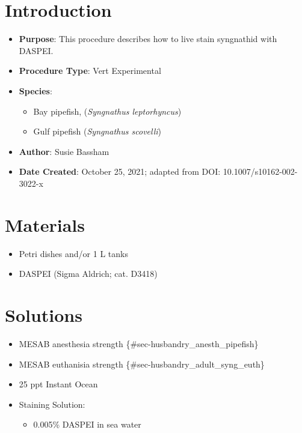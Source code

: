 \documentclass[
  letterpaper,
  DIV=11,
  numbers=noendperiod]{scrreprt}
\providecommand{\tightlist}{%
  \setlength{\itemsep}{0pt}\setlength{\parskip}{0pt}}\usepackage{longtable,booktabs,array}
\begin{document}
\hypertarget{introduction-64}{%
\section{Introduction}\label{introduction-64}}

\begin{itemize}
\tightlist
\item
  \textbf{Purpose}: This procedure describes how to live stain
  syngnathid with DASPEI.
\item
  \textbf{Procedure Type}: Vert Experimental
\item
  \textbf{Species}:

  \begin{itemize}
  \tightlist
  \item
    Bay pipefish, (\emph{Syngnathus leptorhyncus})
  \item
    Gulf pipefish (\emph{Syngnathus scovelli})
  \end{itemize}
\item
  \textbf{Author}: Susie Bassham
\item
  \textbf{Date Created}: October 25, 2021; adapted from DOI:
  10.1007/s10162-002-3022-x
\end{itemize}

\hypertarget{materials-59}{%
\section{Materials}\label{materials-59}}

\begin{itemize}
\tightlist
\item
  Petri dishes and/or 1 L tanks
\item
  DASPEI (Sigma Aldrich; cat. D3418)
\end{itemize}

\hypertarget{solutions-56}{%
\section{Solutions}\label{solutions-56}}

\begin{itemize}
\tightlist
\item
  MESAB anesthesia strength \{\#sec-husbandry\_anesth\_pipefish\}
\item
  MESAB euthanisia strength \{\#sec-husbandry\_adult\_syng\_euth\}
\item
  25 ppt Instant Ocean
\item
  Staining Solution:

  \begin{itemize}
  \tightlist
  \item
    0.005\% DASPEI in sea water
  \end{itemize}
\end{itemize}
\end{document}
